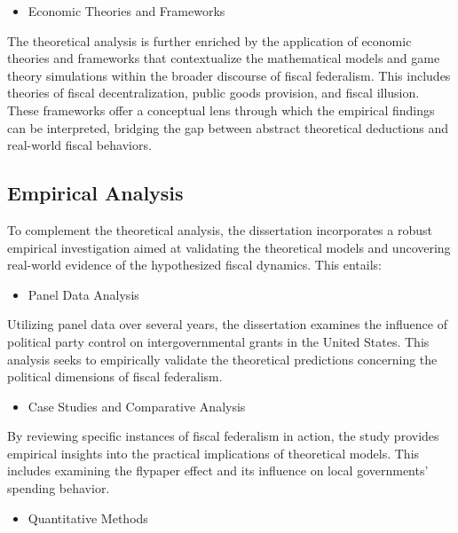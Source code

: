 \begin{itemize}
    \item Economic Theories and Frameworks
\end{itemize}

The theoretical analysis is further enriched by the application of economic theories and frameworks that contextualize the mathematical models and game theory simulations within the broader discourse of fiscal federalism. This includes theories of fiscal decentralization, public goods provision, and fiscal illusion. These frameworks offer a conceptual lens through which the empirical findings can be interpreted, bridging the gap between abstract theoretical deductions and real-world fiscal behaviors.



\subsection{Empirical Analysis}
To complement the theoretical analysis, the dissertation incorporates a robust empirical investigation aimed at validating the theoretical models and uncovering real-world evidence of the hypothesized fiscal dynamics. This entails:

\begin{itemize}
    \item Panel Data Analysis
\end{itemize}

Utilizing panel data over several years, the dissertation examines the influence of political party control on intergovernmental grants in the United States. This analysis seeks to empirically validate the theoretical predictions concerning the political dimensions of fiscal federalism.

\begin{itemize}
    \item Case Studies and Comparative Analysis
\end{itemize}

By reviewing specific instances of fiscal federalism in action, the study provides empirical insights into the practical implications of theoretical models. This includes examining the flypaper effect and its influence on local governments' spending behavior.

\begin{itemize}
    \item Quantitative Methods
\end{itemize}

